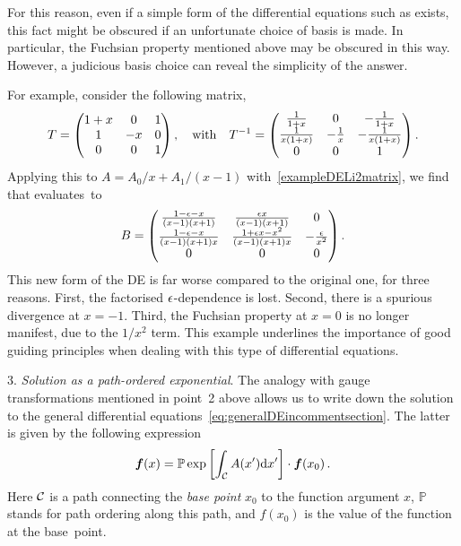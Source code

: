 For this reason, even if a simple form of the differential equations such as  exists, this fact might be obscured if an unfortunate choice of basis is made. 
In particular, the Fuchsian property mentioned above may be obscured in this way.
However, a judicious basis choice can reveal the simplicity of the answer.

For example, consider the following matrix,
\begin{align}
T=  {\begin{pmatrix} 1+x & 0 & 1 \\ 1 & -x & 0 \\ 0 & 0 & 1  \end{pmatrix}} \,,\quad {\rm with} \quad T^{-1} = {\begin{pmatrix} \frac{1}{1+x} & 0 & -\frac{1}{1+x} \\ \frac{1}{x (1+x)} & -\frac{1}{x} & -\frac{1}{x (1+x)} \\ 0 & 0 & 1  \end{pmatrix}} \,.
\end{align}
Applying this to $A= A_0/x + A_1/(x-1)$ with~\eqref{exampleDELi2matrix}, we find that  evaluates~to
\begin{align}
B = {\begin{pmatrix} \frac{1-\epsilon-x}{(x-1)(x+1)} & \frac{\epsilon x}{(x-1)(x+1)} & 0 \\ \frac{1-\epsilon-x}{(x-1)(x+1)x} & \frac{1+\epsilon x-x^2}{(x-1)(x+1)x} & -\frac{\epsilon}{x^2}  \\ 0 & 0 & 0  \end{pmatrix}} \,.
\end{align}
This new form of the DE is far worse compared to the original one, for three reasons. First, the factorised $\epsilon$-dependence is lost. Second, there is a spurious divergence at $x=-1$. Third, the Fuchsian property at $x=0$ is no longer manifest, due to the $1/x^2$ term. This example underlines the importance of good guiding principles when dealing with this type of differential equations.

\smallskip

3.  {\it  Solution as a path-ordered exponential}. 
The analogy with gauge transformations mentioned in point~2 above allows us to write down the solution to the general differential equations~\eqref{eq:generalDEincommentsection}. 
The latter
is given by the following expression 
\begin{align}\label{eq:Wilsonlinesolution}
\vec{f}(x) = {\mathbb P} \exp\left[ \int_{\cal C} A(x') \d x' \right]  \cdot \vec{f}(x_0) \,.
\end{align}
Here ${\cal C}$ is a path connecting the \textit{base point} $x_{0}$ to the function argument $x$,
 ${\mathbb P}$ stands for path ordering along this path, and $f(x_{0})$ is the value of the function at the base~point.


